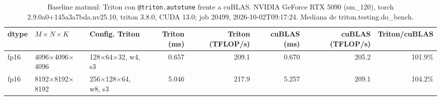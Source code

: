 \begin{table}[htbp]
  \centering\small
  \begin{tabular}{lllrrrrr}
    \toprule
    dtype & $M \times N \times K$ & Config. Triton & Triton (ms) & Triton (TFLOP/s) & cuBLAS (ms) & cuBLAS (TFLOP/s) & Triton/cuBLAS \\
    \midrule
    fp16 & 4096$\times$4096$\times$4096 & 128$\times$64$\times$32, w4, s3 & 0.657 & 209.1 & 0.670 & 205.2 & 101.9\% \\
    fp16 & 8192$\times$8192$\times$8192 & 256$\times$128$\times$64, w8, s3 & 5.046 & 217.9 & 5.257 & 209.1 & 104.2\% \\
    \bottomrule
  \end{tabular}
  \caption{Baseline matmul: Triton con \texttt{@triton.autotune} frente a cuBLAS. NVIDIA GeForce RTX 5090 (sm\_120), torch 2.9.0a0+145a3a7bda.nv25.10, triton 3.8.0, CUDA 13.0; job 20499, 2026-10-02T09:17:24. Mediana de triton.testing.do\_bench.}
  \label{tab:pascal-baseline-matmul}
\end{table}

